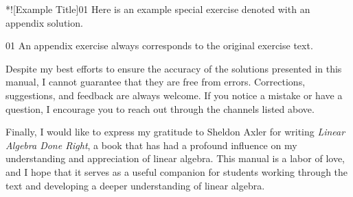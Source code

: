\begin{exercise}*![Example Title]{01}
    Here is an example special exercise denoted with an appendix solution.
\end{exercise}

\begin{apex}{01}
    An appendix exercise always corresponds to the original exercise text.
\end{apex}

Despite my best efforts to ensure the accuracy of the solutions presented in this manual, I cannot guarantee that they are free from errors.
Corrections, suggestions, and feedback are always welcome.
If you notice a mistake or have a question, I encourage you to reach out through the channels listed above.

Finally, I would like to express my gratitude to Sheldon Axler for writing \emph{Linear Algebra Done Right}, a book that has had a profound influence on my understanding and appreciation of linear algebra.
This manual is a labor of love, and I hope that it serves as a useful companion for students working through the text and developing a deeper understanding of linear algebra.
